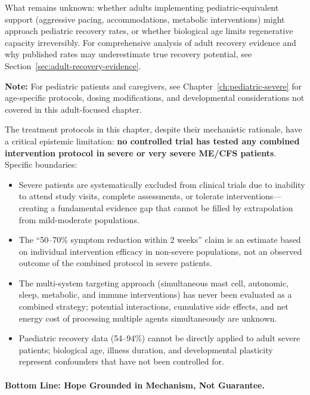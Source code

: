 What remains unknown: whether adults implementing pediatric-equivalent support (aggressive pacing, accommodations, metabolic interventions) might approach pediatric recovery rates, or whether biological age limits regenerative capacity irreversibly. For comprehensive analysis of adult recovery evidence and why published rates may underestimate true recovery potential, see Section~\ref{sec:adult-recovery-evidence}.

\textbf{Note:} For pediatric patients and caregivers, see Chapter~\ref{ch:pediatric-severe} for age-specific protocols, dosing modifications, and developmental considerations not covered in this adult-focused chapter.

\begin{limitation}
The treatment protocols in this chapter, despite their mechanistic rationale, have a critical epistemic limitation: \textbf{no controlled trial has tested any combined intervention protocol in severe or very severe ME/CFS patients}. Specific boundaries:
\begin{itemize}
    \item Severe patients are systematically excluded from clinical trials due to inability to attend study visits, complete assessments, or tolerate interventions---creating a fundamental evidence gap that cannot be filled by extrapolation from mild-moderate populations.
    \item The ``50--70\% symptom reduction within 2 weeks'' claim is an estimate based on individual intervention efficacy in non-severe populations, not an observed outcome of the combined protocol in severe patients.
    \item The multi-system targeting approach (simultaneous mast cell, autonomic, sleep, metabolic, and immune interventions) has never been evaluated as a combined strategy; potential interactions, cumulative side effects, and net energy cost of processing multiple agents simultaneously are unknown.
    \item Paediatric recovery data (54--94\%) cannot be directly applied to adult severe patients; biological age, illness duration, and developmental plasticity represent confounders that have not been controlled for.
\end{itemize}
\end{limitation}

\paragraph{Bottom Line: Hope Grounded in Mechanism, Not Guarantee.}

